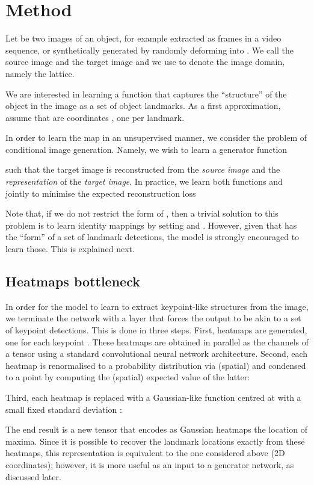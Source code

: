 \documentclass{article}
\begin{document}
\section{Method}\label{s:method}

Let  be two images of an object, for example extracted as frames in a video sequence, or synthetically generated by randomly deforming  into . We call  the source image and  the target image and we use  to denote the image domain, namely the  lattice.

We are interested in learning a function  that captures the ``structure'' of the object in the image as a set of  object landmarks. As a first approximation, assume that  are  coordinates , one per landmark.

In order to learn the map  in an unsupervised manner, we consider the problem of conditional image generation. Namely, we wish to learn a generator function

such that the target image  is reconstructed from the \emph{source image}  and the \emph{representation}  of the \emph{target image}. In practice, we learn both functions  and  jointly to minimise the expected reconstruction loss

Note that, if we do not restrict the form of , then a trivial solution to this problem is to learn identity mappings by setting  and . However, given that  has the ``form'' of a set of landmark detections, the model is strongly encouraged to learn those. This is explained next.

\subsection{Heatmaps bottleneck}\label{s:heatmaps}

In order for the model  to learn to extract keypoint-like structures from the image, we terminate the network  with a layer that forces the output to be akin to a set of  keypoint detections. This is done in three steps. First,  heatmaps  are generated, one for each keypoint . These heatmaps are obtained in parallel as the channels of a  tensor using a standard convolutional neural network architecture. Second, each heatmap is renormalised to a probability distribution via (spatial)  and condensed to a point by computing the (spatial) expected value of the latter:

Third, each heatmap is replaced with a Gaussian-like function centred at  with a small fixed standard deviation :

The end result is a new tensor  that encodes as Gaussian heatmaps the location of  maxima. Since it is possible to recover the landmark locations exactly from these heatmaps, this representation is equivalent to the one considered above (2D coordinates); however, it is more useful as an input to a generator network, as discussed later.
\end{document}
